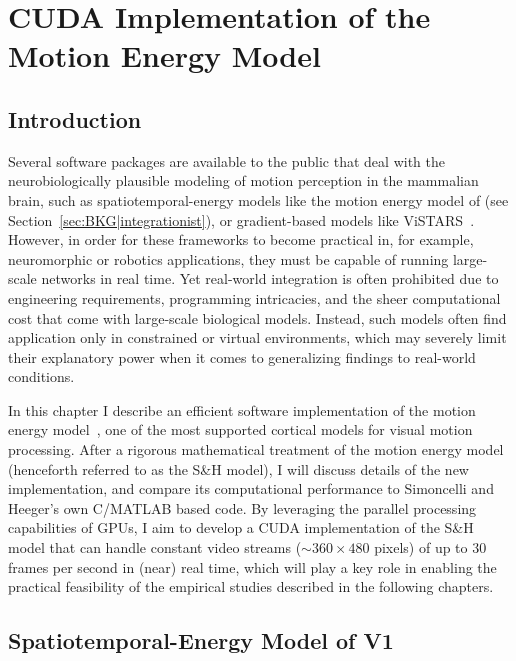 \chapter{CUDA Implementation of the Motion Energy Model}
\label{ch:ME}

\section{Introduction}
Several software packages are available to the public
that deal with the neurobiologically plausible modeling of
motion perception in the mammalian brain, such as
spatiotemporal-energy models like the motion energy model
of \cite{SimoncelliHeeger1998} (see Section~\ref{sec:BKG|integrationist}),
or gradient-based models
like ViSTARS~\citep{Browning2009a,Browning2009b}.
However, in order
for these frameworks to become practical in, for example,
neuromorphic or robotics applications, they must be capable
of running large-scale networks in real time.
Yet real-world integration is often prohibited due
to engineering requirements, programming intricacies, and the
sheer computational cost that come with large-scale biological
models. Instead, such models often find application only in
constrained or virtual environments, which may severely limit
their explanatory power when it comes to generalizing findings to
real-world conditions.

In this chapter I describe an efficient software implementation
of the motion energy model~\citep{SimoncelliHeeger1998},
one of the most supported cortical models for visual motion processing.
After a rigorous mathematical treatment of the motion energy model 
(henceforth referred to as the S\&H model),
I will discuss details of the new implementation, and compare its 
computational performance to Simoncelli and Heeger's own C/MATLAB based code.
By leveraging the parallel processing capabilities of \acp{GPU}, 
I aim to develop a \ac{CUDA} implementation of the S\&H model 
that can handle constant video streams ($\sim 360 \times 480$ pixels)
of up to $30$ frames per second in (near) real time,
which will play a key role in enabling the practical feasibility of the empirical
studies described in the following chapters.



\section{Spatiotemporal-Energy Model of V1}
\label{sec:ME|V1}

